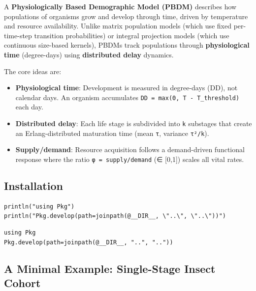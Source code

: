 \label{13173414940196388746}{}


A \textbf{Physiologically Based Demographic Model (PBDM)} describes how populations of organisms grow and develop through time, driven by temperature and resource availability. Unlike matrix population models (which use fixed per-time-step transition probabilities) or integral projection models (which use continuous size-based kernels), PBDMs track populations through \textbf{physiological time} (degree-days) using \textbf{distributed delay} dynamics.



The core ideas are:



\begin{itemize}
\item[1. ] \textbf{Physiological time}: Development is measured in degree-days (DD),  not calendar days. An organism accumulates  \texttt{DD = max(0, T - T\_threshold)} each day.


\item[2. ] \textbf{Distributed delay}: Each life stage is subdivided into \texttt{k}  substages that create an Erlang-distributed maturation time (mean  \texttt{τ}, variance \texttt{τ²/k}).


\item[3. ] \textbf{Supply/demand}: Resource acquisition follows a demand-driven  functional response where the ratio \texttt{φ = supply/demand} (∈ [0,1])  scales all vital rates.

\end{itemize}


\subsection{Installation}



\label{16848947351613073531}{}



\begin{verbatim}
println("using Pkg")
println("Pkg.develop(path=joinpath(@__DIR__, \"..\", \"..\"))")
\end{verbatim}




\begin{verbatim}
using Pkg
Pkg.develop(path=joinpath(@__DIR__, "..", ".."))
\end{verbatim}



\subsection{A Minimal Example: Single-Stage Insect Cohort}



